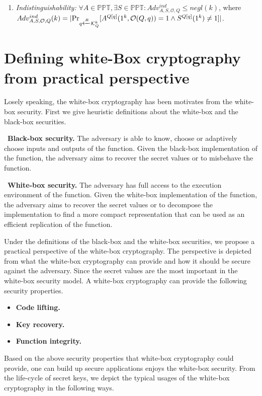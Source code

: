 \documentclass{SCIS2018}
\begin{document}
{\begin{enumerate}
\item \textit{Indistinguishability:} $\forall A\in \mathbb{PPT}, \exists S \in \mathbb{PPT}: Adv_{A, S, \mathcal{O}, Q}^{ind} \leq negl(k)$, where \\ $Adv_{A, S, \mathcal{O}, Q}^{ind}(k) =|\textmd{Pr}_{q \xleftarrow{R} \mathcal{K}^{k}_{Q}}[A^{Q[q]}(1^{k},\mathcal{O}(Q,q))=1 \wedge S^{Q[q]}(1^{k})\neq 1]|$.
\end{enumerate}

\section{Defining white-Box cryptography from practical perspective}
Losely speaking, the white-box cryptography has been motivates from the white-box security. First we give heuristic definitions about the white-box and the black-box securities.

~\textbf{Black-box security.} {The adversary is able to know, choose or adaptively choose inputs and outputs of the function. Given the black-box implementation of the function, the adversary aims to recover the secret values or to misbehave the function.}

~\textbf{White-box security.} {The adversary has full access to the execution environment of the function. Given the white-box implementation of the function, the adversary aims to recover the secret values or to decompose the implementation to find a more compact representation that can be used as an efficient replication of the function.}

Under the definitions of the black-box and the white-box securities, we propose a practical perspective of the white-box cryptography. The perspective is depicted from what the white-box cryptography can provide and how it should be secure against the adversary. Since the secret values are the most important in the white-box security model. A white-box cryptography can provide the following security properties.

\begin{itemize}
\item \textbf{Code lifting.}

\item \textbf{Key recovery.}

\item \textbf{Function integrity.}

\end{itemize}

Based on the above security properties that white-box cryptography could provide, one can build  up secure applications enjoys the white-box security. From the life-cycle of secret keys, we depict the typical usages of the white-box cryptography in the following ways.

}
\end{document}
